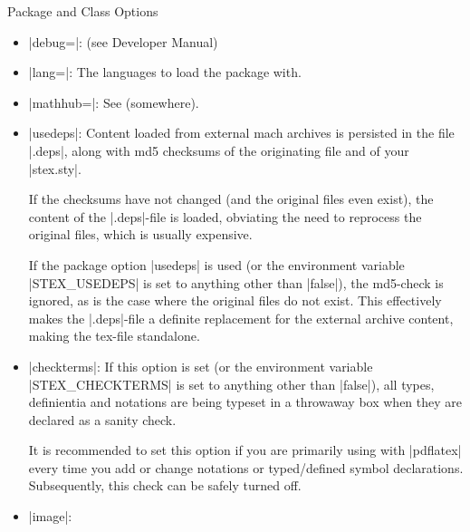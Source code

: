 \documentclass{stex}
\begin{document}
\begin{sfragment}{Package and Class Options}
  
    \begin{itemize}
      \item|debug=|: (see Developer Manual)
      \item|lang=|: The languages to load the 
        package with.
      \item|mathhub=|: See (somewhere).
      \item|usedeps|:
        Content loaded from external mach archives is persisted
        in the file |.deps|, along with md5 checksums
        of the originating file and of your |stex.sty|.

        If the checksums have not changed
        (and the original files even exist), the content of the
        |.deps|-file is loaded, obviating the need to reprocess
        the original files, which is usually expensive.

        If the package option |usedeps| is used (or the environment
        variable |STEX_USEDEPS| is set to anything other than |false|),
        the md5-check is ignored, as is the case where the original
        files do not exist. This effectively makes the |.deps|-file
        a definite replacement for the external archive content,
        making the tex-file standalone.
      \item|checkterms|: If this option is set (or the environment variable
        |STEX_CHECKTERMS| is set to anything other than |false|), all
        types, definientia and notations are being typeset in a throwaway
        box when they are declared as a sanity check.

        It is recommended to set this option if you are primarily using
        \sTeX with |pdflatex| every time you add or change notations
        or typed/defined symbol declarations. Subsequently, this
        check can be safely turned off.
      \item|image|:
    \end{itemize}

\end{sfragment}
\end{document}
